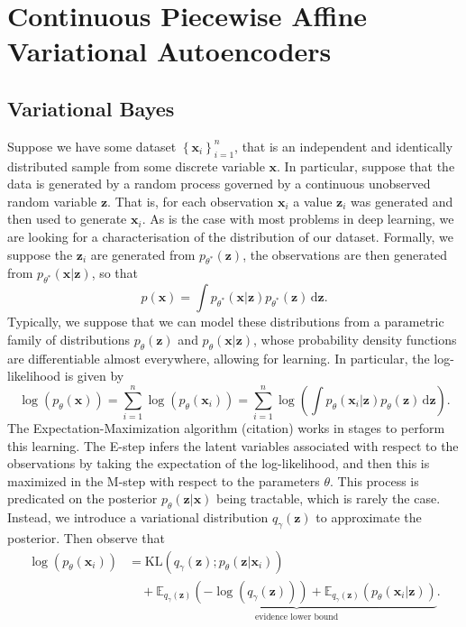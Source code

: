 \section{Continuous Piecewise Affine Variational Autoencoders}\label{sec:cpa_vaes}

\subsection{Variational Bayes}\label{sec:variational_bayes}

Suppose we have some dataset $\left\{\mathbf{x}_i\right\}_{i=1}^n$, that is an independent and identically distributed sample from some discrete variable $\mathbf{x}$. In particular, suppose that the data is generated by a random process governed by a continuous unobserved random variable $\mathbf{z}$. That is, for each observation $\mathbf{x}_i$ a value $\mathbf{z}_i$ was generated and then used to generate $\mathbf{x}_i$. As is the case with most problems in deep learning, we are looking for a characterisation of the distribution of our dataset. Formally, we suppose the $\mathbf{z}_i$ are generated from $p_{\theta^*}(\mathbf{z})$, the observations are then generated from $p_{\theta^*}(\mathbf{x}\vert\mathbf{z})$, so that $$p(\mathbf{x})=\int p_{\theta^*}(\mathbf{x}\vert\mathbf{z})p_{\theta^*}(\mathbf{z})\,\mathrm{d}\mathbf{z}.$$Typically, we suppose that we can model these distributions from a parametric family of distributions $p_{\theta}(\mathbf{z})$ and $p_{\theta}(\mathbf{x}\vert\mathbf{z})$, whose probability density functions are differentiable almost everywhere, allowing for learning. In particular, the log-likelihood is given by $$\log\left(p_{\theta}(\mathbf{x})\right)=\sum_{i=1}^n\log\left(p_{\theta}(\mathbf{x}_i)\right)=\sum_{i=1}^n\log\left(\int p_{\theta}(\mathbf{x}_i\vert\mathbf{z})p_{\theta}(\mathbf{z})\,\mathrm{d}\mathbf{z}\right).$$The Expectation-Maximization algorithm (citation) works in stages to perform this learning. The E-step infers the latent variables associated with respect to the observations by taking the expectation of the log-likelihood, and then this is maximized in the M-step with respect to the parameters $\theta$. This process is predicated on the posterior $p_{\theta}(\mathbf{z}\vert\mathbf{x})$ being tractable, which is rarely the case. Instead, we introduce a variational distribution $q_{\gamma}(\mathbf{z})$ to approximate the posterior. Then observe that
\begin{align*}
    \log\left(p_{\theta}\left(\mathbf{x}_i\right)\right)&=\mathrm{KL}\left(q_{\gamma}(\mathbf{z});p_{\theta}\left(\mathbf{z}\vert\mathbf{x}_i\right)\right)\\&\quad+\underbrace{\mathbb{E}_{q_{\gamma}(\mathbf{z})}\left(-\log\left(q_{\gamma}(\mathbf{z})\right)\right)+\mathbb{E}_{q_{\gamma}(\mathbf{z})}\left(p_{\theta}\left(\mathbf{x}_i\vert\mathbf{z}\right)\right)}_{\text{evidence lower bound}}.
\end{align*}
